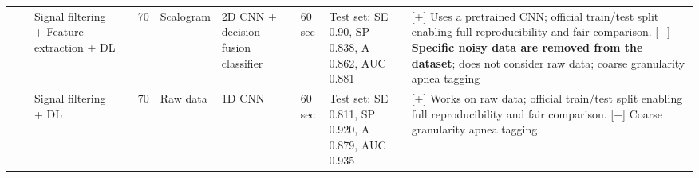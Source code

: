 \documentclass[5p,twocolumn,lefttitle]{elsarticle}
\begin{document}
\begin{table*}[!ht]
{\begin{tabularx}{2\textwidth}{@{}m{2.5em}p{7em}p{10em}lp{2em}p{12em}p{7em}p{3em}p{17em}X@{}}
                            &                                                         & Signal filtering + Feature extraction + DL                     & \cite{singh2019novel}                    & 70            & Scalogram                                                                                                         & 2D CNN + decision fusion classifier & 60 sec                                     & Test set: SE 0.90, SP 0.838, A 0.862, AUC 0.881                                                                                                                                     & [+] Uses a pretrained CNN; official train/test split enabling full reproducibility and fair comparison. [$-$] \textbf{Specific noisy data are removed from the dataset}; does not consider raw data; coarse granularity apnea tagging                                                                                                                                                                                                                                                                                                         \\
                            \cmidrule(l){3-10} 
                            &                                                         & Signal filtering + DL                                          & \cite{DBLP:journals/sensors/ChangYLL20}  & 70            & Raw data                                                                                                          & 1D CNN                              & 60 sec                                     & Test set: SE 0.811, SP 0.920, A 0.879, AUC 0.935                                                                                                                                         & [+] Works on raw data; official train/test split enabling full reproducibility and fair comparison. [$-$] Coarse granularity apnea tagging                                                                                                                                                                                                                                                                                    \\
                            \cmidrule(l){3-10} 

\end{tabularx}}
\end{table*}
\end{document}
